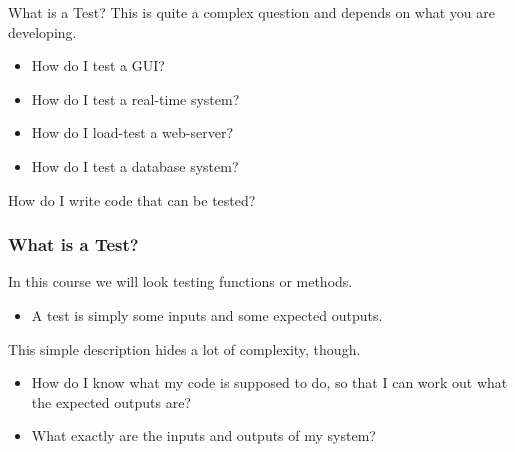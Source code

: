 \documentclass{beamer}
\newcommand{\recordingpause}{
\begin{frame}{Recording Pause}
  \begin{center}
    Recording Pause
  \end{center}
\end{frame}
}
\renewcommand{\recordingpause}{}
\begin{document}
\recordingpause


\begin{frame}{What is a Test?}
  This is quite a complex question and depends on what you are
  developing.
  \begin{itemize}
  \item How do I test a GUI?
  \item How do I test a real-time system?
  \item How do I load-test a web-server?
  \item How do I test a database system?
  \end{itemize}
  How do I write code that can be tested?
  
\end{frame}
\begin{frame}
  \frametitle{What is a Test?}
In this course we will look testing functions or methods. 
  \begin{itemize}
  \item A test is simply some inputs and some expected outputs.
  \end{itemize}
  This simple description hides a lot of complexity, though.
  \begin{itemize}
  \item How do I know what my code is supposed to do, so that I can
    work out what the expected outputs are?
  \item   What exactly are the inputs and outputs of my system?
  \end{itemize}

\end{frame}
\end{document}
